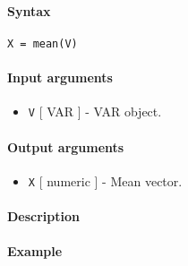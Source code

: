 


	\paragraph{Syntax}\label{syntax}

\begin{verbatim}
X = mean(V)
\end{verbatim}

\paragraph{Input arguments}\label{input-arguments}

\begin{itemize}
\itemsep1pt\parskip0pt
\item
  \texttt{V} {[} VAR {]} - VAR object.
\end{itemize}

\paragraph{Output arguments}\label{output-arguments}

\begin{itemize}
\itemsep1pt\parskip0pt
\item
  \texttt{X} {[} numeric {]} - Mean vector.
\end{itemize}

\paragraph{Description}\label{description}

\paragraph{Example}\label{example}



